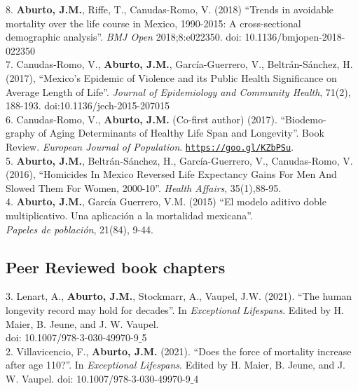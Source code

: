 \documentclass[12pt]{article}
\providecommand*\url[1]{\href{#1}{#1}}
\renewcommand*\url[1]{\href{#1}{\texttt{#1}}}
\begin{document}
8. \textbf{Aburto, J.M.}, Riffe, T., Canudas-Romo, V. (2018) ``Trends in avoidable mortality over the life course in Mexico, 1990-2015:  A cross-sectional demographic analysis''. \emph{BMJ Open} 2018;8:e022350. doi: 10.1136/bmjopen-2018-022350 \\

7. Canudas-Romo, V.,  \textbf{Aburto, J.M.}, Garc\'ia-Guerrero, V., Beltr\'an-S\'anchez, H. (2017),  ``Mexico's Epidemic of Violence and its Public Health Significance on Average Length of Life''. \emph{Journal of Epidemiology and Community Health}, 71(2), 188-193. doi:10.1136/jech-2015-207015 \\ 
  
6. Canudas-Romo, V.,  \textbf{Aburto, J.M.} (Co-first author) (2017). ``Biodemo- \\ graphy of Aging Determinants of Healthy Life Span and Longevity''. Book Review. \emph{European Journal of Population}. \url{https://goo.gl/KZbPSu}. \\ 
	 
5. \textbf{Aburto, J.M.}, Beltr\'an-S\'anchez, H., Garc\'ia-Guerrero, V., Canudas-Romo, V. (2016), ``Homicides In Mexico Reversed Life Expectancy Gains For Men And Slowed Them For Women, 2000-10''. \emph{Health Affairs}, 35(1),88-95. \\ 
		     
4. \textbf{Aburto, J.M.}, Garc\'ia Guerrero, V.M. (2015) ``El modelo aditivo doble multiplicativo. Una aplicaci\'on a la mortalidad mexicana''.\\  \emph{Papeles de poblaci\'on}, 21(84), 9-44. \\
		  
\subsection*{Peer Reviewed book chapters}

3. Lenart, A., \textbf{Aburto, J.M.}, Stockmarr, A., Vaupel, J.W. (2021). ``The human longevity record may hold for decades''. In \emph{Exceptional Lifespans}. Edited by H. Maier, B. Jeune, and J. W. Vaupel. \\
doi: 10.1007/978-3-030-49970-9$\_$5 \\ 


2. Villavicencio, F., \textbf{Aburto, J.M.} (2021). ``Does the force of mortality increase after age 110?''. In \emph{Exceptional Lifespans}. Edited by H. Maier, B. Jeune, and J. W. Vaupel. doi: 10.1007/978-3-030-49970-9$\_$4\\
\end{document}
